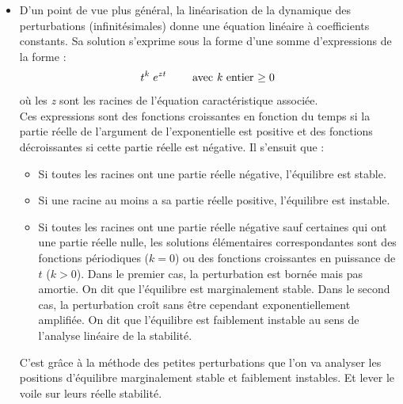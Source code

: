 \documentclass[a4paper]{article}
\begin{document}
\begin{itemize}
\item D'un point de vue plus général, la linéarisation de la dynamique des perturbations (infinitésimales) donne une équation linéaire à coefficients constants. Sa solution s'exprime sous la forme d'une somme d'expressions de la forme : 
\[ t^k \; e^{z t} \qquad \text{ avec \emph{k} entier $ \geq 0 $ } \]
où les \emph{z} sont les racines de l'équation caractéristique associée. \\
Ces expressions sont des fonctions croissantes en fonction du temps si la partie réelle de l'argument de l'exponentielle est positive et des fonctions décroissantes si cette partie réelle est négative. Il s'ensuit que : 
\begin{itemize}
\item Si toutes les racines ont une partie réelle négative, l'équilibre est stable.
\item Si une racine au moins a sa partie réelle positive, l'équilibre est instable.
\item Si toutes les racines ont une partie réelle négative sauf certaines qui ont une partie réelle nulle, les solutions élémentaires correspondantes sont des fonctions périodiques ($ k = 0 $) ou des fonctions croissantes en puissance de $ t $ ($ k > 0 $). Dans le premier cas, la perturbation est bornée mais pas amortie. On dit que l'équilibre est marginalement stable. Dans le second cas, la perturbation croît sans être cependant exponentiellement amplifiée. On dit que l'équilibre est faiblement instable au sens de l'analyse linéaire de la stabilité.
\end{itemize}
C'est grâce à la méthode des petites perturbations que l'on va analyser les positions d'équilibre marginalement stable et faiblement instables. Et lever le voile sur leurs réelle stabilité.


\end{itemize}
\end{document}
